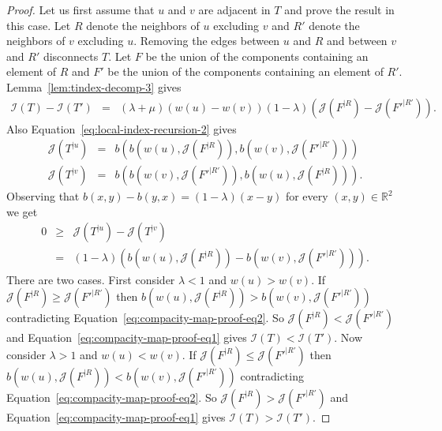\documentclass[11 pt]{modarticle}
\newcommand{\cR}{\mathbb{R}}
\newcommand{\wmap}{w}
\newcommand{\rtree}[2]{{#1}^{\lvert #2}}
\newcommand{\bilinear}{b}
\newcommand{\indexsymbol}{\mathcal{I}}
\newcommand{\tindex}[1]{\indexsymbol(#1)}
\newcommand{\rindexsymbol}{\mathcal{J}}
\newcommand{\rindex}[2]{\rindexsymbol(\rtree{#2}{#1})}
\begin{document}
\begin{proof}
Let us first assume that $u$ and $v$ are adjacent in $T$ and prove the result in this case. Let $R$ denote the neighbors of $u$ excluding $v$ and $R'$ denote the neighbors of $v$ excluding $u$. Removing the edges between $u$ and $R$ and between $v$ and $R'$ disconnects $T$. Let $F$ be the union of the components containing an element of $R$ and $F'$ be the union of the components containing an element of $R'$. Lemma~\ref{lem:tindex-decomp-3} gives
\begin{eqnarray}
	\tindex{T} - \tindex{T'} & = & (\lambda + \mu)(\wmap(u) - \wmap(v))(1 - \lambda)(\rindex{R}{F} - \rindex{R'}{F'}). \label{eq:compacity-map-proof-eq1}
\end{eqnarray}
Also Equation~\eqref{eq:local-index-recursion-2} gives
\begin{eqnarray*}
	\rindex{u}{T} & = & \bilinear(\bilinear(\wmap(u),\rindex{R}{F}), \bilinear(\wmap(v),\rindex{R'}{F'})) \\
	\rindex{v}{T} & = & \bilinear(\bilinear(\wmap(v),\rindex{R'}{F'}), \bilinear(\wmap(u),\rindex{R}{F})).
\end{eqnarray*}
Observing that $\bilinear(x, y) - \bilinear(y, x) = (1 - \lambda)(x-y)$ for every $(x, y) \in \cR^2$ we get
\begin{eqnarray}
	0 & \geq & \rindex{u}{T} - \rindex{v}{T} \nonumber \\
	& = & (1 - \lambda) \left(\bilinear(\wmap(u),\rindex{R}{F}) - \bilinear(\wmap(v),\rindex{R'}{F'})\right). \label{eq:compacity-map-proof-eq2}
\end{eqnarray}
There are two cases. First consider $\lambda < 1$ and $\wmap(u) > \wmap(v)$. If $\rindex{R}{F} \geq \rindex{R'}{F'}$ then $\bilinear(\wmap(u),\rindex{R}{F}) > \bilinear(\wmap(v),\rindex{R'}{F'})$ contradicting Equation~\eqref{eq:compacity-map-proof-eq2}. So $\rindex{R}{F} < \rindex{R'}{F'}$ and Equation~\eqref{eq:compacity-map-proof-eq1} gives $\tindex{T} < \tindex{T'}$. Now consider $\lambda > 1$ and $\wmap(u) < \wmap(v)$. If $\rindex{R}{F} \leq \rindex{R'}{F'}$ then $\bilinear(\wmap(u),\rindex{R}{F}) < \bilinear(\wmap(v),\rindex{R'}{F'})$ contradicting Equation~\eqref{eq:compacity-map-proof-eq2}. So $\rindex{R}{F} > \rindex{R'}{F'}$ and Equation~\eqref{eq:compacity-map-proof-eq1} gives $\tindex{T} > \tindex{T'}$.



\end{proof}
\end{document}
